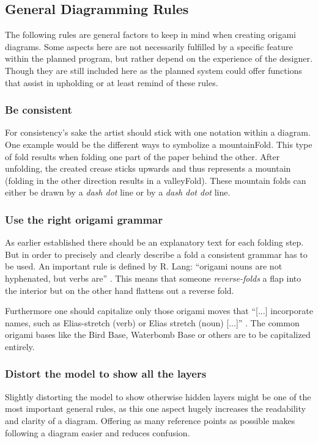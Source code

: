 \newpage
\subsection{General Diagramming Rules}
\label{sec:generalRules}

The following rules are general factors to keep in mind when creating origami diagrams. Some aspects here are not necessarily fulfilled by a specific feature within the planned program, but rather depend on the experience of the designer. Though they are still included here as the planned system could offer functions that assist in upholding or at least remind of these rules.

\subsubsection*{Be consistent}
For consistency's sake the artist should stick with one notation within a diagram. One example would be the different ways to symbolize a \gls{mountainFold}. This type of fold results when folding one part of the paper behind the other. After unfolding, the created crease sticks upwards and thus represents a mountain (folding in the other direction results in a \gls{valleyFold}). These mountain folds can either be drawn by a \emph{dash dot} line or by a \emph{dash dot dot} line.

\subsubsection*{Use the right origami grammar}
As earlier established there should be an explanatory text for each folding step. But in order to precisely and clearly describe a fold a consistent grammar has to be used. An important rule is defined by R. Lang: \enquote{origami nouns are not hyphenated, but verbs are} \cite{Lang}. This means that someone \emph{reverse-folds} a flap into the interior but on the other hand flattens out a reverse fold.

Furthermore one should capitalize only those origami moves that \enquote{[...] incorporate names, such as Elias-stretch (verb) or Elias stretch (noun) [...]} \cite{Lang}. The common origami bases like the Bird Base, Waterbomb Base or others are to be capitalized entirely.

\subsubsection*{Distort the model to show all the layers}
Slightly distorting the model to show otherwise hidden layers might be one of the most important general rules, as this one aspect hugely increases the readability and clarity of a diagram. Offering as many reference points as possible makes following a diagram easier and reduces confusion.

